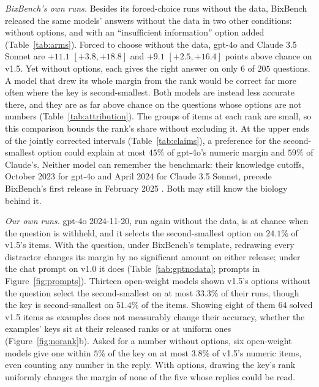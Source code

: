 \documentclass{article}
\begin{document}
\emph{BixBench's own runs.} Besides its forced-choice runs without the data, BixBench released the same models'
answers without the data in two other conditions: without options, and with an ``insufficient information'' option
added (Table~\ref{tab:arms}). Forced to choose without the data, gpt-4o and Claude 3.5 Sonnet are $+11.1$
$[+3.8,+18.8]$ and $+9.1$ $[+2.5,+16.4]$ points above chance on v1.5. Yet without options, each gives the right answer
on only $6$ of $205$ questions. A model that drew its whole margin from the rank would be correct far more often where
the key is second-smallest. Both models are instead less accurate there, and they are as far above chance on the
questions whose options are not numbers (Table~\ref{tab:attribution}). The groups of items at each rank are small, so
this comparison bounds the rank's share without excluding it. At the upper ends of the jointly corrected intervals
(Table~\ref{tab:claims}), a preference for the second-smallest option could explain at most $45\%$ of gpt-4o's numeric
margin and $59\%$ of Claude's. Neither model can remember the benchmark: their knowledge cutoffs, October 2023 for
gpt-4o and April 2024 for Claude 3.5 Sonnet, precede BixBench's first release in February 2025 \citep{bixbench}. Both
may still know the biology behind it.

\emph{Our own runs.} gpt-4o 2024-11-20, run again without the data, is at chance when the question is withheld, and it
selects the second-smallest option on $24.1\%$ of v1.5's items. With the question, under BixBench's template,
redrawing every distractor changes its margin by no significant amount on either release; under the chat prompt on
v1.0 it does (Table~\ref{tab:gptnodata}; prompts in Figure~\ref{fig:prompts}). Thirteen open-weight models shown v1.5's options without the question select the
second-smallest on at most $33.3\%$ of their runs, though the key is second-smallest on $51.4\%$ of the items. Showing
eight of them $64$ solved v1.5 items as examples does not measurably change their accuracy, whether the examples' keys
sit at their released ranks or at uniform ones (Figure~\ref{fig:norank}b). Asked for a number without options, six
open-weight models give one within $5\%$ of the key on at most $3.8\%$ of v1.5's numeric items, even counting any
number in the reply. With options, drawing the key's rank uniformly changes the margin of none of the five whose
replies could be read.
\end{document}
